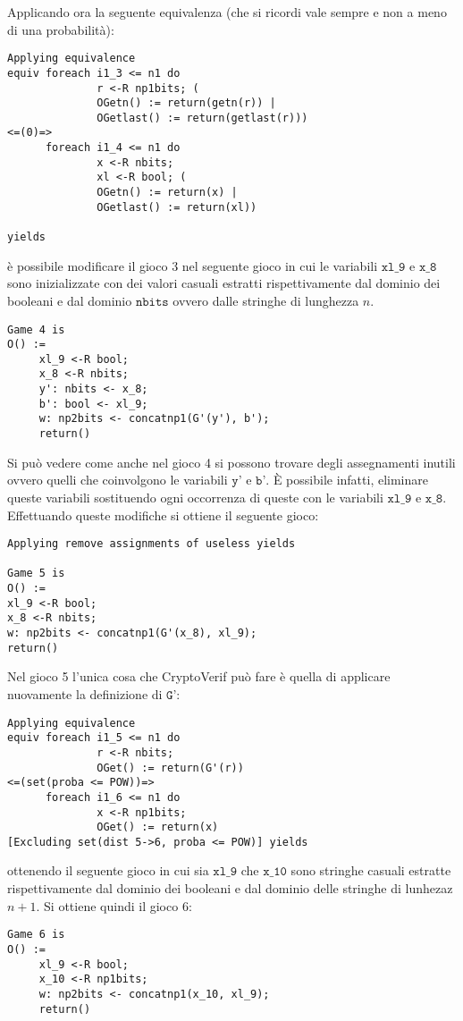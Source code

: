 \documentclass[a4paper,openright,twoside,12pt]{report}
\begin{document}
Applicando ora la seguente equivalenza (che si ricordi vale sempre e non a meno di una probabilit\`a):
\begin{verbatim} 
Applying equivalence
equiv foreach i1_3 <= n1 do 
              r <-R np1bits; (
              OGetn() := return(getn(r)) |
              OGetlast() := return(getlast(r)))
<=(0)=>
      foreach i1_4 <= n1 do 
              x <-R nbits; 
              xl <-R bool; (
              OGetn() := return(x) |
              OGetlast() := return(xl))

yields
\end{verbatim}
\`e possibile modificare il gioco 3 nel seguente gioco in cui le variabili $\texttt{xl\_9}$ e $\texttt{x\_8}$ sono inizializzate con dei valori casuali estratti rispettivamente dal dominio dei booleani e dal dominio
$\texttt{nbits}$ ovvero dalle stringhe di lunghezza $n$.
\begin{verbatim} 
Game 4 is
O() :=
     xl_9 <-R bool;
     x_8 <-R nbits;
     y': nbits <- x_8;
     b': bool <- xl_9;
     w: np2bits <- concatnp1(G'(y'), b');
     return()
\end{verbatim}
Si pu\`o vedere come anche nel gioco 4 si possono trovare degli assegnamenti inutili ovvero quelli che coinvolgono le variabili $\texttt{y'}$ e $\texttt{b'}$. \`E possibile infatti, eliminare queste variabili
sostituendo ogni occorrenza di queste con le variabili $\texttt{xl\_9}$ e $\texttt{x\_8}$. Effettuando queste modifiche si ottiene il seguente gioco:
\begin{verbatim} 
Applying remove assignments of useless yields

Game 5 is
O() :=
xl_9 <-R bool;
x_8 <-R nbits;
w: np2bits <- concatnp1(G'(x_8), xl_9);
return()
\end{verbatim}
Nel gioco 5 l'unica cosa che CryptoVerif pu\`o fare \`e quella di applicare nuovamente la definizione di $\texttt{G'}$:
\begin{verbatim}
Applying equivalence
equiv foreach i1_5 <= n1 do 
              r <-R nbits; 
              OGet() := return(G'(r))
<=(set(proba <= POW))=>
      foreach i1_6 <= n1 do 
              x <-R np1bits; 
              OGet() := return(x)
[Excluding set(dist 5->6, proba <= POW)] yields
\end{verbatim}
ottenendo il seguente gioco in cui sia $\texttt{xl\_9}$ che $\texttt{x\_10}$ sono stringhe casuali estratte rispettivamente dal dominio dei booleani e dal dominio delle stringhe di lunhezaz $n+1$. Si ottiene quindi il gioco 6:
\begin{verbatim}
Game 6 is
O() :=
     xl_9 <-R bool;
     x_10 <-R np1bits;
     w: np2bits <- concatnp1(x_10, xl_9);
     return()
\end{verbatim}
\end{document}
